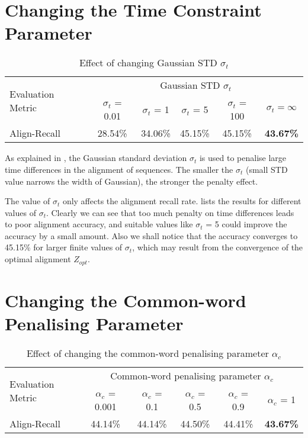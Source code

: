 \section{Changing the Time Constraint Parameter}

\begin{table}[!b]
    \caption{Effect of changing Gaussian STD $\sigma_t$}
    \centering
    \label{tab:eval-res-gauss}
    \begin{tabular}{l c c c c c}
    \toprule
    \multirow{2}{*}{Evaluation Metric} & \multicolumn{5}{c}{Gaussian STD $\sigma_t$} \\
    \cmidrule{2-6}
    & $\sigma_t$ = 0.01 & $\sigma_t$ = 1 & $\sigma_t$ = 5 & $\sigma_t$ = 100 & $\sigma_t = \infty$\\
    \midrule
    Align-Recall & 28.54\%&34.06\%&45.15\%&45.15\%&\textbf{43.67\%}\\
    \bottomrule
    \end{tabular}
\end{table}

As explained in , the Gaussian standard deviation $\sigma_t$ is used to penalise large time differences in the alignment of sequences. The smaller the $\sigma_t$ (small STD value narrows the width of Gaussian), the stronger the penalty effect.

The value of $\sigma_t$ only affects the alignment recall rate.  lists the results for different values of $\sigma_t$. Clearly we can see that too much penalty on time differences leads to poor alignment accuracy, and suitable values like $\sigma_t$ = 5 could improve the accuracy by a small amount. Also we shall notice that the accuracy converges to 45.15\% for larger finite values of $\sigma_t$, which may result from the convergence of the optimal alignment $Z_{opt}$.


\section{Changing the Common-word Penalising Parameter}

\begin{table}[!t]
    \caption{Effect of changing the common-word penalising parameter $\alpha_c$}
    \centering
    \label{tab:eval-res-alpha}
    \begin{tabular}{l c c c c c}
    \toprule
    \multirow{2}{*}{Evaluation Metric} & \multicolumn{5}{c}{Common-word penalising parameter $\alpha_c$} \\
    \cmidrule{2-6}
    & $\alpha_c$ = 0.001 & $\alpha_c$ = 0.1 & $\alpha_c$ = 0.5 & $\alpha_c$ = 0.9 & $\alpha_c$ = 1\\
    \midrule
    Align-Recall & 44.14\%&44.14\%&44.50\%&44.41\%&\textbf{43.67\%}\\
    \bottomrule
    \end{tabular}
\end{table}

